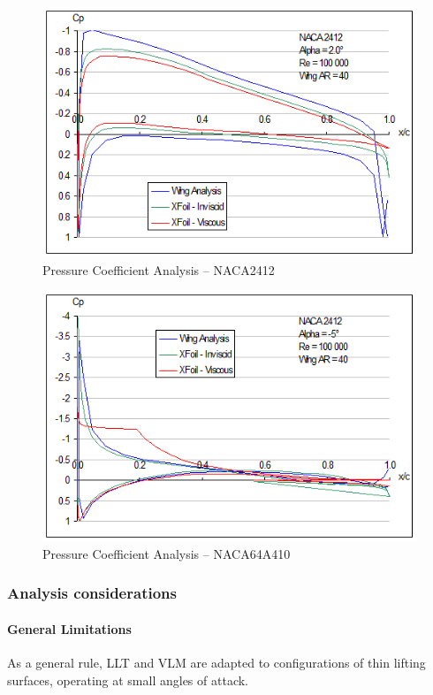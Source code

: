 \documentclass[a4paper,twoside,12pt,dvips]{article}
\begin{document}
\begin{figure}[htbp]
  \includegraphics[width=0.8\linewidth]{img-23}\centering 
  \caption{Pressure Coefficient Analysis -- NACA2412}
  \label{fig:pressure_coeficient_analysis_naca2412}
\end{figure}

\begin{figure}[htbp]
  \includegraphics[width=0.8\linewidth]{img-24}\centering 
  \caption{Pressure Coefficient Analysis -- NACA64A410}
  \label{fig:pressure_coeficient_analysis_naca_64A410}
\end{figure}


\subsubsection{Analysis considerations}

\paragraph{General Limitations}

As a general rule, LLT and VLM are adapted to configurations of thin
lifting surfaces, operating at small angles of attack.
\end{document}
